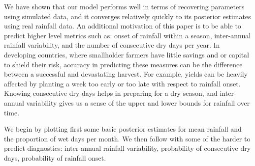 \documentclass[12pt]{article}
\begin{document}
We have shown that our model performs well in terms of recovering parameters using simulated data, and it converges relatively quickly to its posterior estimates using real rainfall data. An additional motivation of this paper is to be able to predict higher level metrics such as: onset of rainfall within a season, inter-annual rainfall variability, and the number of consecutive dry days per year. In developing countries, where smallholder farmers have little savings and or capital to shield their risk, accuracy in predicting these measures can be the difference between a successful and devastating harvest. For example, yields can be heavily affected by planting a week too early or too late with respect to rainfall onset. Knowing consecutive dry days helps in preparing for a dry season, and inter-annual variability gives us a sense of the upper and lower bounds for rainfall over time. 

We begin by plotting first some basic posterior estimates for mean rainfall and the proportion of wet days per month. We then follow with some of the harder to predict diagnostics: inter-annual rainfall variability, probability of consecutive dry days, probability of rainfall onset.








\end{document}

